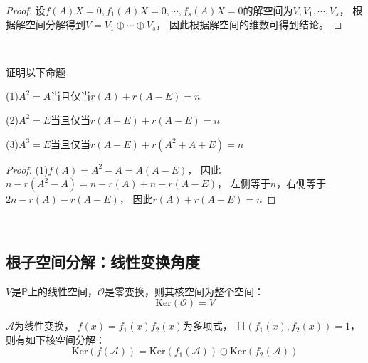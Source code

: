 \begin{proof}
  设$f(A)X = 0, f_1(A)X = 0,\cdots,f_s(A) X = 0$的解空间为$V,V_1,\cdots,V_s$，
  根据解空间分解得到$V = V_1 \oplus \cdots \oplus V_s$，
  因此根据解空间的维数可得到结论。
\end{proof}

~

\begin{exercise}[空间分解研究矩阵的秩]
  证明以下命题

  (1)$A^2 = A$当且仅当$r(A) + r(A - E) = n$

  (2)$A^2 = E$当且仅当$r(A+E) + r(A - E) = n$

  (3)$A^3 = E$当且仅当$r(A - E) + r(A^2 + A + E) = n$
\end{exercise}


\begin{proof}
  (1)$f(A) = A^2 - A = A(A - E)$，
  因此$n - r(A^2 - A) = n - r(A) + n - r(A - E)$，
  左侧等于$n$，右侧等于$2n - r(A) - r(A - E)$，
  因此$r(A) + r(A - E) = n$
\end{proof}

~

\subsection{根子空间分解：线性变换角度}

\begin{lemma}[零变换的核空间]
  $V$是$\mathbb{P}$上的线性空间，$\mathcal{O}$是零变换，则其核空间为整个空间：
  \begin{equation*}
    \mathrm{Ker}(\mathcal{O}) = V
  \end{equation*}
\end{lemma}

\begin{theorem}[核空间分解]
  $\mathcal{A}$为线性变换，
  $f(x) = f_1(x)f_2(x)$为多项式，
  且$(f_1(x),f_2(x)) = 1$，
  则有如下核空间分解：
  \begin{equation*}
    \mathrm{Ker}(f(\mathcal{A})) = \mathrm{Ker}(f_1(\mathcal{A})) \oplus \mathrm{Ker}(f_2(\mathcal{A}))
  \end{equation*}
\end{theorem}

